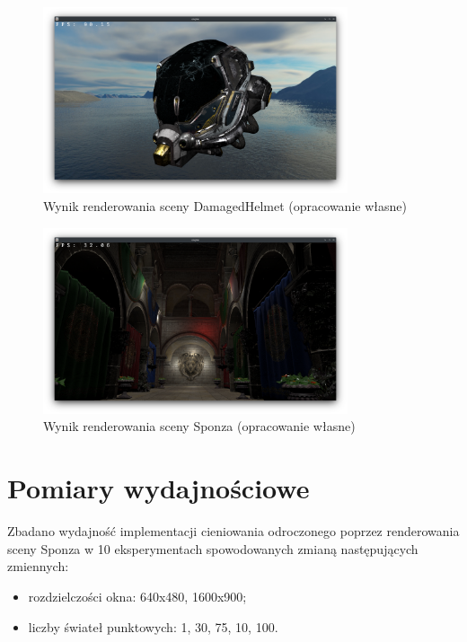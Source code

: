 \begin{figure}[!htb]
	\centering
	\includegraphics[width=0.8\textwidth]{images/render_damagedhelmet.png}
	\caption{Wynik renderowania sceny DamagedHelmet (opracowanie własne)}
	\label{screenshot_damagedhelmet}
\end{figure}

\begin{figure}[!htb]
	\centering
	\includegraphics[width=0.8\textwidth]{images/render_sponza.png}
	\caption{Wynik renderowania sceny Sponza (opracowanie własne)}
	\label{screenshot_sponza}
\end{figure}

\section{Pomiary wydajnościowe}

Zbadano wydajność implementacji cieniowania odroczonego poprzez renderowania sceny Sponza w 10 eksperymentach spowodowanych zmianą następujących zmiennych:
\begin{itemize}
	\item rozdzielczości okna: 640x480, 1600x900;
	\item liczby świateł punktowych: 1, 30, 75, 10, 100.
\end{itemize}

